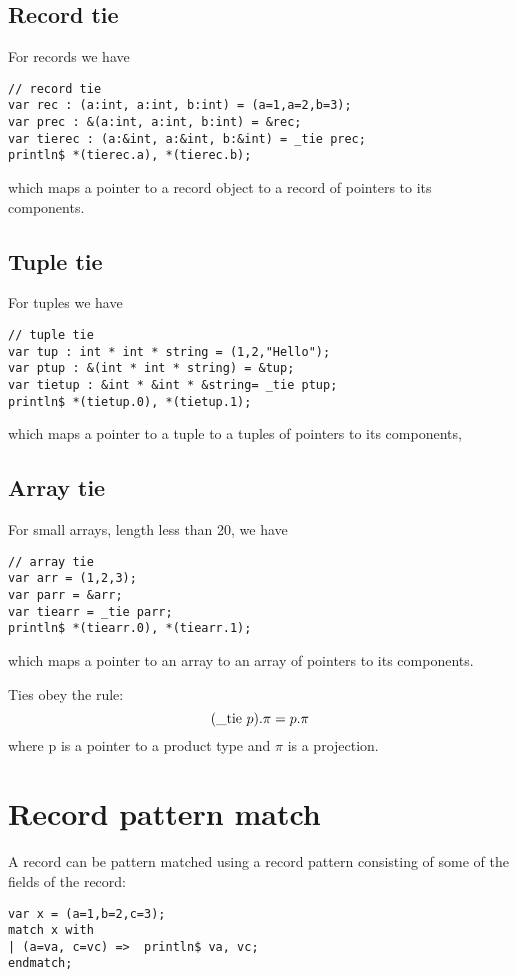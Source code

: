\documentclass{article}
\begin{document}
\subsection{Record tie}
For records we have

\begin{verbatim}
// record tie
var rec : (a:int, a:int, b:int) = (a=1,a=2,b=3);
var prec : &(a:int, a:int, b:int) = &rec;
var tierec : (a:&int, a:&int, b:&int) = _tie prec;
println$ *(tierec.a), *(tierec.b);
\end{verbatim}

which maps a pointer to a record object to a record of pointers to its
components. 

\subsection{Tuple tie}
For tuples we have

\begin{verbatim}
// tuple tie
var tup : int * int * string = (1,2,"Hello");
var ptup : &(int * int * string) = &tup;
var tietup : &int * &int * &string= _tie ptup;
println$ *(tietup.0), *(tietup.1);
\end{verbatim}

which maps a pointer to a tuple to a tuples of pointers to its
components, 

\subsection{Array tie}
For small arrays, length less than 20, we have

\begin{verbatim}
// array tie
var arr = (1,2,3);
var parr = &arr;
var tiearr = _tie parr;
println$ *(tiearr.0), *(tiearr.1);
\end{verbatim}

which maps a pointer to an array to an array of pointers to its components.

Ties obey the rule:
$$ ({\rm \_tie}\ p) . \pi = p . \pi$$
where p is a pointer to a product type and $\pi$ is a projection.

\section{Record pattern match}
A record can be pattern matched using a record pattern
consisting of some of the fields of the record:

\begin{verbatim}
var x = (a=1,b=2,c=3);
match x with
| (a=va, c=vc) =>  println$ va, vc;
endmatch;
\end{verbatim}
\end{document}
